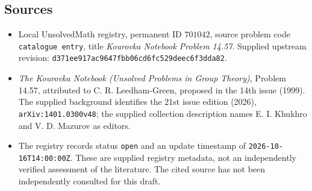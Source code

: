 \documentclass[11pt]{article}
\begin{document}
\subsection{Sources}
\begin{itemize}
\item Local UnsolvedMath registry, permanent ID \(701042\), source problem code \texttt{catalogue entry}, title \emph{Kourovka Notebook Problem 14.57}. Supplied upstream revision: \texttt{d371ee917ac9647fbb06cd6fc529deec6f3dda82}.
\item \emph{The Kourovka Notebook (Unsolved Problems in Group Theory)}, Problem 14.57, attributed to C. R. Leedham-Green, proposed in the 14th issue (1999). The supplied background identifies the 21st issue edition (2026), \texttt{arXiv:1401.0300v48}; the supplied collection description names E. I. Khukhro and V. D. Mazurov as editors.
\item The registry records status \texttt{open} and an update timestamp of \texttt{2026-10-16T14:00:00Z}. These are supplied registry metadata, not an independently verified assessment of the literature. The cited source has not been independently consulted for this draft.
\end{itemize}
\end{document}
